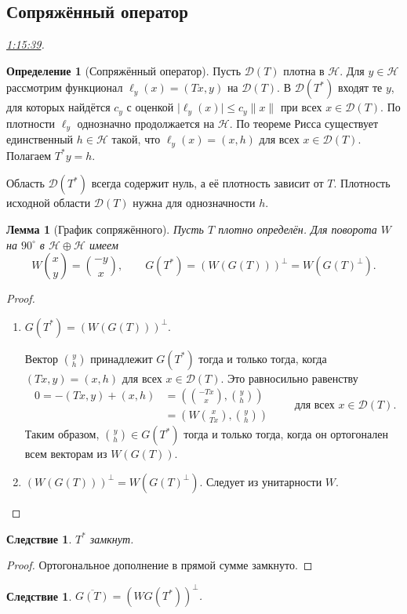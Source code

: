 \documentclass[11pt,a4paper]{article}
\theoremstyle{plain}
\newtheorem{lemma}[theorem]{Лемма}
\newtheorem{corollary}[theorem]{Следствие}
\theoremstyle{definition}
\newtheorem{definition}[theorem]{Определение}
\newcommand{\Hh}{\mathcal H}
\newcommand{\Dom}{\mathcal D}
\newcommand{\abs}[1]{\lvert#1\rvert}
\newcommand{\norm}[1]{\lVert#1\rVert}
\newcommand{\at}[3]{\href{https://www.youtube.com/watch?v=#1&t=#2s}{#3}}
\newcommand{\topic}[2]{\Needspace{5\baselineskip}\subsection*{#1}\noindent\emph{#2.}\par\nobreak\smallskip}
\begin{document}
\topic{Сопряжённый оператор}{\at{HFKXR_j7aA4}{4539}{1:15:39}}
\begin{definition}[Сопряжённый оператор]
Пусть $\Dom(T)$ плотна в $\Hh$. Для $y\in\Hh$ рассмотрим
функционал $\ell_y(x)=(Tx,y)$ на $\Dom(T)$. В $\Dom(T^*)$
входят те $y$, для которых найдётся $c_y$ с оценкой
$\abs{\ell_y(x)}\le c_y\norm x$ при всех $x\in\Dom(T)$.
По плотности $\ell_y$ однозначно
продолжается на $\Hh$. По теореме Рисса существует единственный
$h\in\Hh$ такой, что $\ell_y(x)=(x,h)$ для всех $x\in\Dom(T)$.
Полагаем $T^*y=h$.
\end{definition}
Область $\Dom(T^*)$ всегда содержит нуль, а её плотность
зависит от $T$. Плотность исходной области $\Dom(T)$ нужна для
однозначности $h$.
\begin{lemma}[График сопряжённого]
\label{lem:adjoint-graph}
Пусть $T$ плотно определён. Для поворота $W$ на $90^{\circ}$
в $\Hh\oplus\Hh$ имеем
\[
 W\binom{x}{y}=\binom{-y}{x},\qquad
 G(T^*)=(W(G(T)))^\perp=W(G(T)^\perp).
\]
\end{lemma}
\begin{proof}
\leavevmode
\begin{enumerate}
\item $G(T^*)=(W(G(T)))^\perp$.

Вектор $\binom{y}{h}$ принадлежит $G(T^*)$ тогда и только тогда,
когда $(Tx,y)=(x,h)$ для всех $x\in\Dom(T)$. Это равносильно
равенству
\[
  \begin{aligned}
  0=-(Tx,y)+(x,h)&=\left(\binom{-Tx}{x},\binom{y}{h}\right) \\ &=\left(W\binom{x}{Tx},\binom{y}{h}\right)
  \end{aligned}
 \qquad\text{для всех }x\in\Dom(T).
\]
Таким образом, $\binom{y}{h}\in G(T^*)$ тогда и только тогда, когда он ортогонален всем векторам из $W(G(T))$.

\item $(W(G(T)))^\perp=W(G(T)^\perp)$.
Следует из унитарности $W$.
\end{enumerate}
\end{proof}
\begin{corollary}
\label{cor:adjoint-is-closed}
$T^*$ замкнут.
\end{corollary}
\begin{proof}
Ортогональное дополнение в прямой сумме замкнуто.
\end{proof}
\begin{corollary}
\label{cor:closure-of-graph}
$\overline{G(T)}=(WG(T^*))^\perp$.
\end{corollary}
\end{document}
